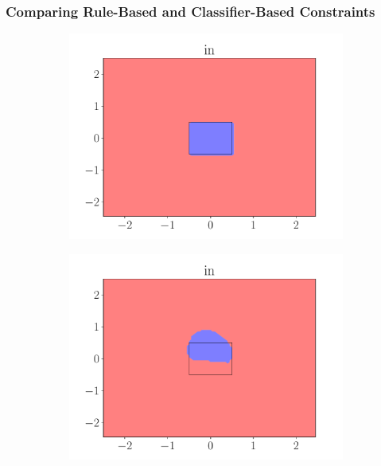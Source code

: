 \documentclass{beamer}
\begin{document}
\begin{frame}
    \frametitle{Comparing Rule-Based and Classifier-Based Constraints}
    \begin{figure}[ht]
        \begin{subfigure}{0.45\textwidth}
            \centering
            \includegraphics[width=\textwidth]{figures/in_rule.pdf}
        \end{subfigure}
        \begin{subfigure}{0.45\textwidth}
            \centering
            \includegraphics[width=\textwidth]{figures/in_predicate_only.pdf}
        \end{subfigure}
        \begin{subfigure}{0.45\textwidth}

\end{subfigure}
\end{figure}
\end{frame}
\end{document}
